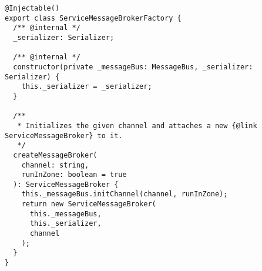 \begin{verbatim}
@Injectable()
export class ServiceMessageBrokerFactory {
  /** @internal */
  _serializer: Serializer;

  /** @internal */
  constructor(private _messageBus: MessageBus, _serializer: Serializer) {
    this._serializer = _serializer;
  }

  /**
   * Initializes the given channel and attaches a new {@link
ServiceMessageBroker} to it.
   */
  createMessageBroker(
    channel: string,
    runInZone: boolean = true
  ): ServiceMessageBroker {
    this._messageBus.initChannel(channel, runInZone);
    return new ServiceMessageBroker(
      this._messageBus,
      this._serializer,
      channel
    );
  }
}
\end{verbatim}
